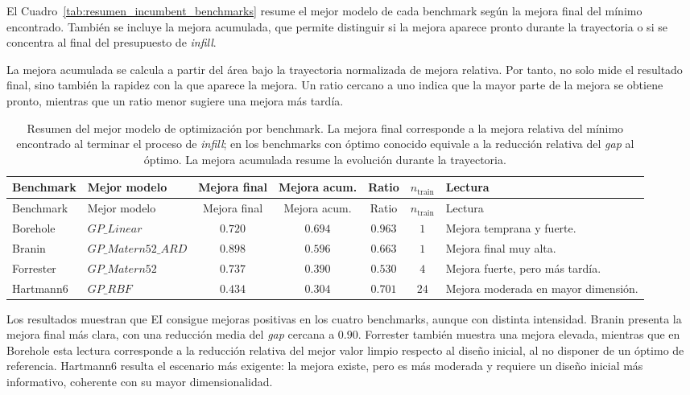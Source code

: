 El Cuadro~\ref{tab:resumen_incumbent_benchmarks} resume el mejor modelo de cada benchmark según la mejora final del mínimo encontrado. También se incluye la mejora acumulada, que permite distinguir si la mejora aparece pronto durante la trayectoria o si se concentra al final del presupuesto de \emph{infill}.

La mejora acumulada se calcula a partir del área bajo la trayectoria normalizada de mejora relativa. Por tanto, no solo mide el resultado final, sino también la rapidez con la que aparece la mejora. Un ratio cercano a uno indica que la mayor parte de la mejora se obtiene pronto, mientras que un ratio menor sugiere una mejora más tardía.

\protect{}\label{tab:resumen_incumbent_benchmarks}
\begin{longtable}[]{@{}llccccl@{}}
\caption{Resumen del mejor modelo de optimización por benchmark. La mejora final corresponde a la mejora relativa del mínimo encontrado al terminar el proceso de \emph{infill}; en los benchmarks con óptimo conocido equivale a la reducción relativa del \emph{gap} al óptimo. La mejora acumulada resume la evolución durante la trayectoria.}\tabularnewline
\toprule\noalign{}
Benchmark & Mejor modelo & Mejora final & Mejora acum. & Ratio & \(n_{\text{train}}\) & Lectura \\
\midrule\noalign{}
\endfirsthead
\toprule\noalign{}
Benchmark & Mejor modelo & Mejora final & Mejora acum. & Ratio & \(n_{\text{train}}\) & Lectura \\
\midrule\noalign{}
\endhead
\bottomrule\noalign{}
\endlastfoot
Borehole & \(GP\_Linear\) & \(0.720\) & \(0.694\) & \(0.963\) & \(1\) & Mejora temprana y fuerte. \\
Branin & \(GP\_Matern52\_ARD\) & \(0.898\) & \(0.596\) & \(0.663\) & \(1\) & Mejora final muy alta. \\
Forrester & \(GP\_Matern52\) & \(0.737\) & \(0.390\) & \(0.530\) & \(4\) & Mejora fuerte, pero más tardía. \\
Hartmann6 & \(GP\_RBF\) & \(0.434\) & \(0.304\) & \(0.701\) & \(24\) & Mejora moderada en mayor dimensión. \\
\end{longtable}

Los resultados muestran que EI consigue mejoras positivas en los cuatro benchmarks, aunque con distinta intensidad. Branin presenta la mejora final más clara, con una reducción media del \emph{gap} cercana a \(0.90\). Forrester también muestra una mejora elevada, mientras que en Borehole esta lectura corresponde a la reducción relativa del mejor valor limpio respecto al diseño inicial, al no disponer de un óptimo de referencia. Hartmann6 resulta el escenario más exigente: la mejora existe, pero es más moderada y requiere un diseño inicial más informativo, coherente con su mayor dimensionalidad.

